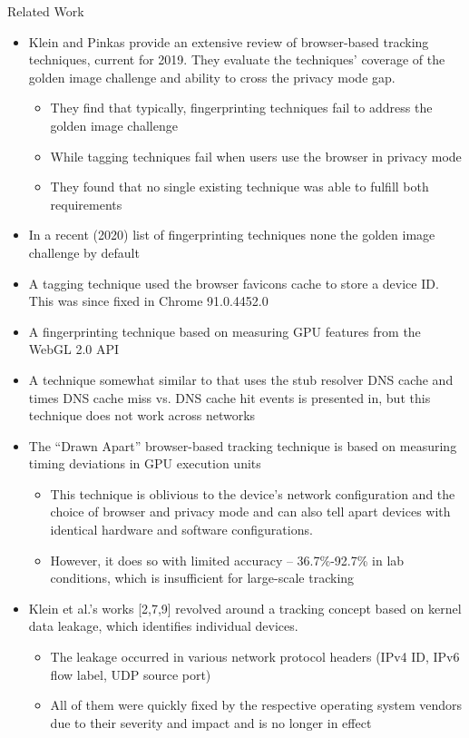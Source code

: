 \documentclass[aspectratio=169, hyperref={colorlinks=true, allcolors=SecondaryColor}, c]{beamer}
\begin{document}
\begin{frame}[fragile]{Related Work}{}
	\ifbeamer
	\else
		\begin{itemize}
			\item Klein and Pinkas provide an extensive review of browser-based tracking techniques, current for 2019. They evaluate the techniques’ coverage of the golden image challenge and ability to cross the privacy mode gap.
			\begin{itemize}
				\item They find that typically, fingerprinting techniques fail to address the golden image challenge
				\item While tagging techniques fail when users use the browser in privacy mode
				\item They found that no single existing technique was able to fulfill both requirements
			\end{itemize}
			\item In a recent (2020) list of fingerprinting techniques none the golden image challenge by default
			\item A tagging technique used the browser favicons cache to store a device ID. This was since fixed in Chrome 91.0.4452.0
			\item A fingerprinting technique based on measuring GPU features from the WebGL 2.0 API
			\item A technique somewhat similar to that uses the stub resolver DNS cache and times DNS cache miss vs. DNS cache hit events is presented in, but this technique does not work across networks
			\item The \enquote{Drawn Apart} browser-based tracking technique is based on measuring timing deviations in GPU execution units
			\begin{itemize}
				\item This technique is oblivious to the device’s network configuration and the choice of browser and privacy mode and can also tell apart devices with identical hardware and software configurations.
				\item However, it does so with limited accuracy – 36.7\%-92.7\% in lab conditions, which is insufficient for large-scale tracking
			\end{itemize}
			\item Klein et al.’s works [2,7,9] revolved around a tracking concept based on kernel data leakage, which identifies individual devices.
			\begin{itemize}
				\item The leakage occurred in various network protocol headers (IPv4 ID, IPv6 flow label, UDP source port)
				\item All of them were quickly fixed by the respective operating system vendors due to their severity and impact and is no longer in effect
			\end{itemize}
		\end{itemize}
	\fi
\end{frame}
\end{document}
